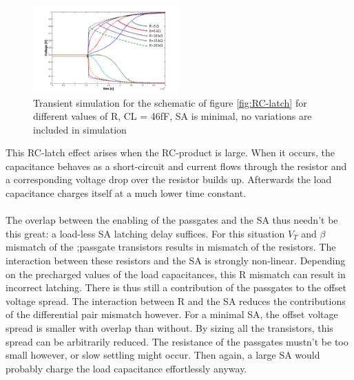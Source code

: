\documentclass[journal]{IEEEtran}
\begin{document}
\begin{figure}[ht!]
  \centering
  \includegraphics[width=0.5\textwidth]{../fig/hfdstk-sensamp-RC-latch-sim.png}
  \caption{Transient simulation for the schematic of figure \ref{fig:RC-latch} for different values of R, CL = 46fF, SA is minimal, no variations are included in simulation}
  \label{fig:RC-latch-sim}
\end{figure}

This RC-latch effect arises when the RC-product is large. When it occurs, the capacitance behaves as a short-circuit and current flows through the resistor and a corresponding voltage drop over the resistor builds up. Afterwards the load capacitance charges itself at a much lower time constant.

\paragraph{}
The overlap between the enabling of the passgates and the SA thus needn't be this great: a load-less SA latching delay suffices. For this situation $V_{T}$ and $\beta$ mismatch of the ;passgate transistors results in mismatch of the resistors. The interaction between these resistors and the SA is strongly non-linear. Depending on the precharged values of the load capacitances, this R mismatch can result in incorrect latching. There is thus still a contribution of the passgates to the offset voltage spread. The interaction between R and the SA reduces the contributions of the differential pair mismatch however. For a minimal SA, the offset voltage spread is smaller with overlap than without. By sizing all the transistors, this spread can be arbitrarily reduced. The resistance of the passgates mustn't be too small however, or slow settling might occur. Then again, a large SA would probably charge the load capacitance effortlessly anyway.
\end{document}
